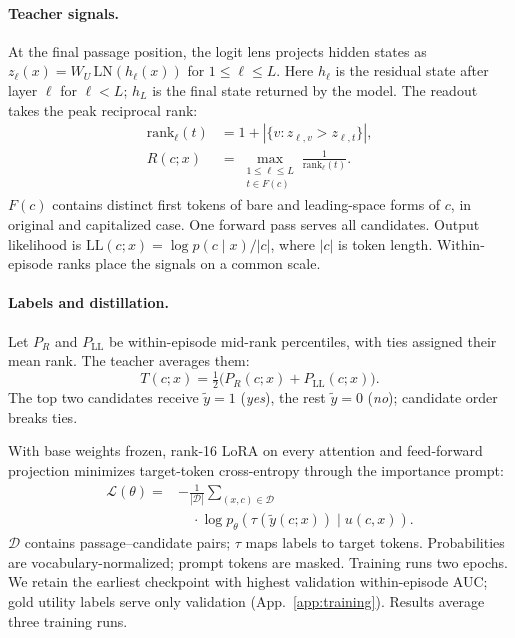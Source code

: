 \paragraph{Teacher signals.}
At the final passage position, the logit lens projects hidden states as $z_\ell(x)=W_U\,\mathrm{LN}(h_\ell(x))$ for $1\leq\ell\leq L$. Here $h_\ell$ is the residual state after layer $\ell$ for $\ell<L$; $h_L$ is the final state returned by the model. The readout takes the peak reciprocal rank:
\begin{equation}
\begin{split}
\mathrm{rank}_\ell(t)&=1+|\{v:z_{\ell,v}>z_{\ell,t}\}|,\\
R(c;x)&=\max_{\substack{1\leq\ell\leq L\\t\in F(c)}}\frac{1}{\mathrm{rank}_\ell(t)}.
\end{split}
\label{eq:wrr}
\end{equation}
$F(c)$ contains distinct first tokens of bare and leading-space forms of $c$, in original and capitalized case. One forward pass serves all candidates. Output likelihood is $\mathrm{LL}(c;x)=\log p(c\mid x)/|c|$, where $|c|$ is token length. Within-episode ranks place the signals on a common scale.

\paragraph{Labels and distillation.}
Let $P_R$ and $P_{\mathrm{LL}}$ be within-episode mid-rank percentiles, with ties assigned their mean rank. The teacher averages them:
\begin{equation}
T(c;x)=\tfrac12\bigl(P_R(c;x)+P_{\mathrm{LL}}(c;x)\bigr).
\label{eq:teacher}
\end{equation}
The top two candidates receive $\tilde y=1$ (\emph{yes}), the rest $\tilde y=0$ (\emph{no}); candidate order breaks ties.

With base weights frozen, rank-16 LoRA \citep{hu2021lora} on every attention and feed-forward projection minimizes target-token cross-entropy through the importance prompt:
\begin{equation}
\begin{split}
\mathcal L(\theta)={}&-\frac{1}{|\mathcal D|}\sum_{(x,c)\in\mathcal D}\\
&\quad\cdot\log p_\theta\!\left(\tau(\tilde y(c;x))\mid u(c,x)\right).
\end{split}
\label{eq:loss}
\end{equation}
$\mathcal D$ contains passage--candidate pairs; $\tau$ maps labels to target tokens. Probabilities are vocabulary-normalized; prompt tokens are masked. Training runs two epochs. We retain the earliest checkpoint with highest validation within-episode AUC; gold utility labels serve only validation (App.~\ref{app:training}). Results average three training runs.

